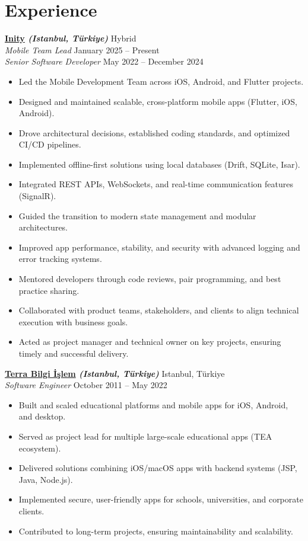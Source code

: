 \documentclass[10pt,a4paper]{extarticle}
\begin{document}
\section{Experience}
\vspace{5pt}
\textbf{\href{https://inity.com.tr}{Inity} \textit{(Istanbul, Türkiye)}} \hfill Hybrid\\
\textit{Mobile Team Lead} \hfill January 2025 -- Present\\
\textit{Senior Software Developer} \hfill May 2022 -- December 2024
\vspace{5pt}
\begin{itemize}[leftmargin=*,noitemsep,topsep=0pt]
    \item Led the Mobile Development Team across iOS, Android, and Flutter projects.
	\item Designed and maintained scalable, cross-platform mobile apps (Flutter, iOS, Android).
	\item Drove architectural decisions, established coding standards, and optimized CI/CD pipelines.
	\item Implemented offline-first solutions using local databases (Drift, SQLite, Isar).
	\item Integrated REST APIs, WebSockets, and real-time communication features (SignalR).
	\item Guided the transition to modern state management and modular architectures.
	\item Improved app performance, stability, and security with advanced logging and error tracking systems.
	\item Mentored developers through code reviews, pair programming, and best practice sharing.
	\item Collaborated with product teams, stakeholders, and clients to align technical execution with business goals.
\item Acted as project manager and technical owner on key projects, ensuring timely and successful delivery.
\end{itemize}
\vspace{15pt}
\textbf{\href{https://www.terrabilgiisilem}{Terra Bilgi İşlem} \textit{(Istanbul, Türkiye)}} \hfill Istanbul, Türkiye\\
\textit{Software Engineer} \hfill October 2011 -- May 2022
\vspace{5pt}
\begin{itemize}[leftmargin=*,noitemsep,topsep=0pt]
    \item Built and scaled educational platforms and mobile apps for iOS, Android, and desktop.
	\item Served as project lead for multiple large-scale educational apps (TEA ecosystem).
	\item Delivered solutions combining iOS/macOS apps with backend systems (JSP, Java, Node.js).
	\item Implemented secure, user-friendly apps for schools, universities, and corporate clients.
	\item Contributed to long-term projects, ensuring maintainability and scalability.
\end{itemize}
\end{document}
